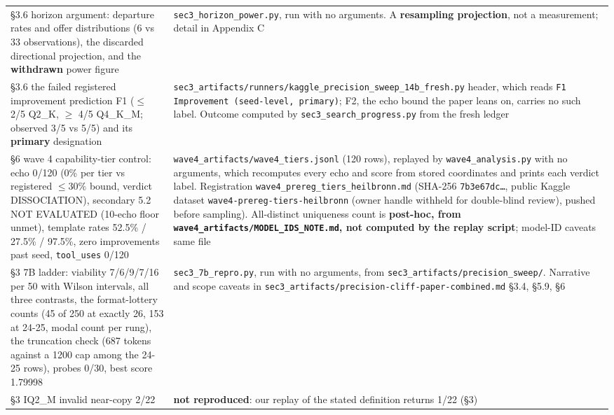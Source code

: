 \begin{longtable}{@{}p{}p{}@{}}
\S3.6 horizon argument: departure rates and offer distributions (6 vs 33 observations), the discarded directional projection, and the \textbf{withdrawn} power figure &
\texttt{sec3\_horizon\_power.py}, run with no arguments. A \textbf{resampling projection}, not a measurement; detail in Appendix C \\

\S3.6 the failed registered improvement prediction F1 ($\le$ 2/5 Q2\_K, $\ge$ 4/5 Q4\_K\_M; observed 3/5 vs 5/5) and its \textbf{primary} designation &
\texttt{sec3\_\bk{}artifacts/\bk{}runners/\bk{}kaggle\_\bk{}precision\_\bk{}sweep\_\bk{}14b\_\bk{}fresh.py} header, which reads \texttt{F1 Improvement (seed-level, primary)}; F2, the echo bound the paper leans on, carries no such label. Outcome computed by \texttt{sec3\_search\_progress.py} from the fresh ledger \\

\S6 wave 4 capability-tier control: echo 0/120 (0\% per tier vs registered $\le 30\%$ bound, verdict DISSOCIATION), secondary 5.2 NOT EVALUATED (10-echo floor unmet), template rates 52.5\% / 27.5\% / 97.5\%, zero improvements past seed, \texttt{tool\_uses} 0/120 &
\texttt{wave4\_\bk{}artifacts/\bk{}wave4\_\bk{}tiers.jsonl} (120 rows), replayed by \texttt{wave4\_analysis.py} with no arguments, which recomputes every echo and score from stored coordinates and prints each verdict label. Registration \texttt{wave4\_prereg\_tiers\_heilbronn.md} (SHA-256 \texttt{7b3e67dc\ldots}, public Kaggle dataset \texttt{wave4-prereg-tiers-heilbronn} (owner handle withheld for double-blind review), pushed before sampling). All-distinct uniqueness count is \textbf{post-hoc, from \texttt{wave4\_\bk{}artifacts/\bk{}MODEL\_\bk{}IDS\_\bk{}NOTE.md}, not computed by the replay script}; model-ID caveats same file \\

\S3 7B ladder: viability 7/6/9/7/16 per 50 with Wilson intervals, all three contrasts, the format-lottery counts (45 of 250 at exactly 26, 153 at 24-25, modal count per rung), the truncation check (687 tokens against a 1200 cap among the 24-25 rows), probes 0/30, best score 1.79998 &
\texttt{sec3\_7b\_repro.py}, run with no arguments, from \texttt{sec3\_artifacts/precision\_sweep/}. Narrative and scope caveats in \texttt{sec3\_\bk{}artifacts/\bk{}precision-cliff-paper-combined.md} \S3.4, \S5.9, \S6 \\

\S3 IQ2\_M invalid near-copy 2/22 &
\textbf{not reproduced}: our replay of the stated definition returns 1/22 (\S3) \\


\end{longtable}

